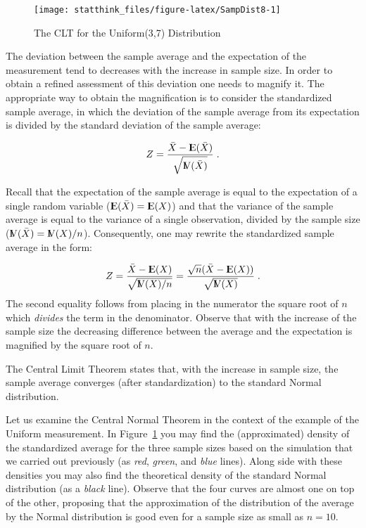 \documentclass[]{krantz}
\newcommand{\Expec}{{\rm I\kern-.3em E}}
\newcommand{\Var}{{\rm I\kern-.3em V}}
\theoremstyle{definition}
\theoremstyle{definition}
\theoremstyle{definition}
\theoremstyle{remark}
\begin{document}
\begin{figure}

{\centering \texttt{[image: statthink\_files/figure-latex/SampDist8-1]} 

}

\caption{The CLT for the Uniform(3,7) Distribution}\label{fig:SampDist8}
\end{figure}

The deviation between the sample average and the expectation of the
measurement tend to decreases with the increase in sample size. In order
to obtain a refined assessment of this deviation one needs to magnify
it. The appropriate way to obtain the magnification is to consider the
standardized sample average, in which the deviation of the sample
average from its expectation is divided by the standard deviation of the
sample average:

\[Z = \frac{\bar X - \Expec(\bar X)}{\sqrt{\Var(\bar X)}}\;.\]

Recall that the expectation of the sample average is equal to the
expectation of a single random variable (\(\Expec(\bar X) = \Expec(X)\))
and that the variance of the sample average is equal to the variance of
a single observation, divided by the sample size
(\(\Var(\bar X) = \Var(X)/n\)). Consequently, one may rewrite the
standardized sample average in the form:

\[Z = \frac{\bar X - \Expec(X)}{\sqrt{\Var(X)/n}}= \frac{\sqrt{n}(\bar X - \Expec(X))}{\sqrt{\Var(X)}}\;.\]
The second equality follows from placing in the numerator the square
root of \(n\) which \emph{divides} the term in the denominator. Observe that
with the increase of the sample size the decreasing difference between
the average and the expectation is magnified by the square root of \(n\).

The Central Limit Theorem states that, with the increase in sample size,
the sample average converges (after standardization) to the standard
Normal distribution.

Let us examine the Central Normal Theorem in the context of the example
of the Uniform measurement. In Figure~\ref{fig:SampDist8} you may find
the (approximated) density of the standardized average for the three
sample sizes based on the simulation that we carried out previously (as
\emph{red}, \emph{green}, and \emph{blue} lines). Along side with these densities you
may also find the theoretical density of the standard Normal
distribution (as a \emph{black} line). Observe that the four curves are
almost one on top of the other, proposing that the approximation of the
distribution of the average by the Normal distribution is good even for
a sample size as small as \(n=10\).
\end{document}
